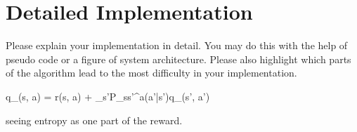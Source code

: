 \section{Detailed Implementation}
\label{section:implementation}
Please explain your implementation in detail. You may do this with the help of pseudo code or a figure of system architecture. Please also highlight which parts of the algorithm lead to the most difficulty in your implementation.


q_\pi(s, a) = r(s, a) + \gamma\sum_{s'\inS}P_{ss'}^a\sum\pi(a'|s')q_\pi(s', a')

seeing entropy as one part of the reward.